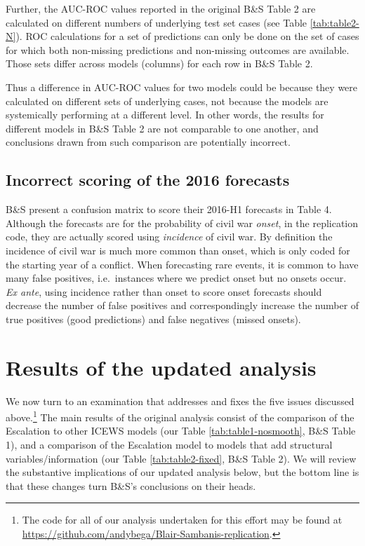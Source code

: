 \documentclass[
]{article}
\begin{document}
Further, the AUC-ROC values reported in the original B\&S Table 2 are calculated on different numbers of underlying test set cases (see Table \ref{tab:table2-N}). ROC calculations for a set of predictions can only be done on the set of cases for which both non-missing predictions and non-missing outcomes are available. Those sets differ across models (columns) for each row in B\&S Table 2.

Thus a difference in AUC-ROC values for two models could be because they were calculated on different sets of underlying cases, not because the models are systemically performing at a different level. In other words, the results for different models in B\&S Table 2 are not comparable to one another, and conclusions drawn from such comparison are potentially incorrect.

\hypertarget{incorrect-scoring-of-the-2016-forecasts}{%
\subsection{Incorrect scoring of the 2016 forecasts}\label{incorrect-scoring-of-the-2016-forecasts}}

B\&S present a confusion matrix to score their 2016-H1 forecasts in Table 4. Although the forecasts are for the probability of civil war \emph{onset}, in the replication code, they are actually scored using \emph{incidence} of civil war. By definition the incidence of civil war is much more common than onset, which is only coded for the starting year of a conflict. When forecasting rare events, it is common to have many false positives, i.e.~instances where we predict onset but no onsets occur. \emph{Ex ante}, using incidence rather than onset to score onset forecasts should decrease the number of false positives and correspondingly increase the number of true positives (good predictions) and false negatives (missed onsets).

\hypertarget{results-of-the-updated-analysis}{%
\section{Results of the updated analysis}\label{results-of-the-updated-analysis}}

We now turn to an examination that addresses and fixes the five issues discussed above.\footnote{The code for all of our analysis undertaken for this effort may be found at \url{https://github.com/andybega/Blair-Sambanis-replication}.} The main results of the original analysis consist of the comparison of the Escalation to other ICEWS models (our Table \ref{tab:table1-nosmooth}, B\&S Table 1), and a comparison of the Escalation model to models that add structural variables/information (our Table \ref{tab:table2-fixed}, B\&S Table 2). We will review the substantive implications of our updated analysis below, but the bottom line is that these changes turn B\&S's conclusions on their heads.
\end{document}
